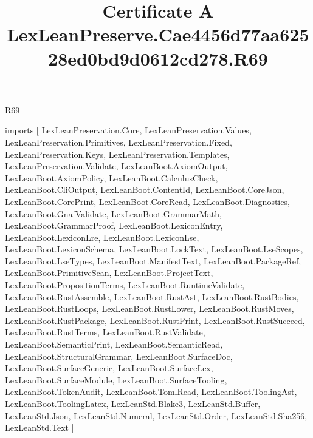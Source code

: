 \begin{lexlean}{R69}
\title{Certificate A LexLeanPreserve.Cae4456d77aa62528ed0bd9d0612cd278.R69}
\begin{coremodule}
imports [
  LexLeanPreservation.Core,
  LexLeanPreservation.Values,
  LexLeanPreservation.Primitives,
  LexLeanPreservation.Fixed,
  LexLeanPreservation.Keys,
  LexLeanPreservation.Templates,
  LexLeanPreservation.Validate,
  LexLeanBoot.AxiomOutput,
  LexLeanBoot.AxiomPolicy,
  LexLeanBoot.CalculusCheck,
  LexLeanBoot.CliOutput,
  LexLeanBoot.ContentId,
  LexLeanBoot.CoreJson,
  LexLeanBoot.CorePrint,
  LexLeanBoot.CoreRead,
  LexLeanBoot.Diagnostics,
  LexLeanBoot.GnafValidate,
  LexLeanBoot.GrammarMath,
  LexLeanBoot.GrammarProof,
  LexLeanBoot.LexiconEntry,
  LexLeanBoot.LexiconLre,
  LexLeanBoot.LexiconLse,
  LexLeanBoot.LexiconSchema,
  LexLeanBoot.LockText,
  LexLeanBoot.LseScopes,
  LexLeanBoot.LseTypes,
  LexLeanBoot.ManifestText,
  LexLeanBoot.PackageRef,
  LexLeanBoot.PrimitiveScan,
  LexLeanBoot.ProjectText,
  LexLeanBoot.PropositionTerms,
  LexLeanBoot.RuntimeValidate,
  LexLeanBoot.RustAssemble,
  LexLeanBoot.RustAst,
  LexLeanBoot.RustBodies,
  LexLeanBoot.RustLoops,
  LexLeanBoot.RustLower,
  LexLeanBoot.RustMoves,
  LexLeanBoot.RustPackage,
  LexLeanBoot.RustPrint,
  LexLeanBoot.RustSucceed,
  LexLeanBoot.RustTerms,
  LexLeanBoot.RustValidate,
  LexLeanBoot.SemanticPrint,
  LexLeanBoot.SemanticRead,
  LexLeanBoot.StructuralGrammar,
  LexLeanBoot.SurfaceDoc,
  LexLeanBoot.SurfaceGeneric,
  LexLeanBoot.SurfaceLex,
  LexLeanBoot.SurfaceModule,
  LexLeanBoot.SurfaceTooling,
  LexLeanBoot.TokenAudit,
  LexLeanBoot.TomlRead,
  LexLeanBoot.ToolingAst,
  LexLeanBoot.ToolingLatex,
  LexLeanStd.Blake3,
  LexLeanStd.Buffer,
  LexLeanStd.Json,
  LexLeanStd.Numeral,
  LexLeanStd.Order,
  LexLeanStd.Sha256,
  LexLeanStd.Text
]


\end{coremodule}
\end{lexlean}

